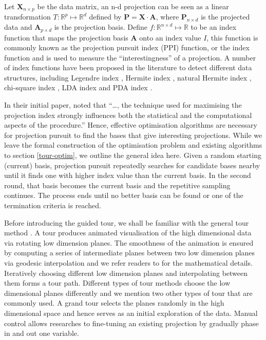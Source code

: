 \documentclass[12pt]{article}
\begin{document}
Let \(\mathbf{X}_{n \times p}\) be the data matrix, an n-d projection can be seen as a linear transformation \(T: \mathbb{R}^p \mapsto \mathbb{R}^d\) defined by \(\mathbf{P} = \mathbf{X} \cdot \mathbf{A}\), where \(\mathbf{P}_{n \times d}\) is the projected data and \(\mathbf{A}_{p\times d}\) is the projection basis. Define \(f: \mathbb{R}^{n \times d} \mapsto \mathbb{R}\) to be an index function that maps the projection basis \(\mathbf{A}\) onto an index value \(I\), this function is commonly known as the projection pursuit index (PPI) function, or the index function and is used to measure the ``interestingness'' of a projection. A number of index functions have been proposed in the literature to detect different data structures, including Legendre index \citep{friedman1974projection}, Hermite index \citep{hall1989polynomial}, natural Hermite index \citep{cook1993projection}, chi-square index \citep{posse1995projection}, LDA index \citep{lee2005projection} and PDA index \citep{lee2010projection}.

In their initial paper, \citet{friedman1974projection} noted that ``\ldots{}, the technique used for maximising the projection index strongly influences both the statistical and the computational aspects of the procedure.'' Hence, effective optimisation algorithms are necessary for projection pursuit to find the bases that give interesting projections. While we leave the formal construction of the optimisation problem and existing algorithms to section \ref{tour-optim}, we outline the general idea here. Given a random starting (current) basis, projection pursuit repeatedly searches for candidate bases nearby until it finds one with higher index value than the current basis. In the second round, that basis becomes the current basis and the repetitive sampling continues. The process ends until no better basis can be found or one of the termination criteria is reached.

Before introducing the guided tour, we shall be familiar with the general tour method \citep{cook2008grand}. A tour produces animated visualisation of the high dimensional data via rotating low dimension planes. The smoothness of the animation is ensured by computing a series of intermediate planes between two low dimension planes via geodesic interpolation and we refer readers to \citet{buja2005computational} for the mathematical details. Iteratively choosing different low dimension planes and interpolating between them forms a tour path. Different types of tour methods choose the low dimensional planes differently and we mention two other types of tour that are commonly used. A grand tour selects the planes randomly in the high dimensional space and hence serves as an initial exploration of the data. Manual control allows researches to fine-tuning an existing projection by gradually phase in and out one variable.
\end{document}
